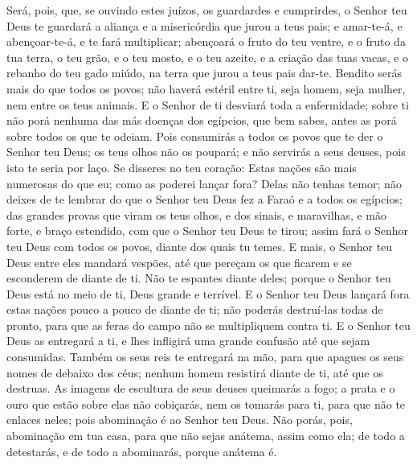 Será, pois, que, se ouvindo estes juízos, os guardardes e
cumprirdes, o Senhor teu Deus te guardará a aliança e a misericórdia
que jurou a teus pais; e amar-te-á, e abençoar-te-á, e te
fará multiplicar; abençoará o fruto do teu ventre, e o fruto da tua
terra, o teu grão, e o teu mosto, e o teu azeite, e a criação das
tuas vacas, e o rebanho do teu gado miúdo, na terra que jurou a teus
pais dar-te. Bendito serás mais do que todos os povos; não
haverá estéril entre ti, seja homem, seja mulher, nem entre os teus
animais. E o Senhor de ti desviará toda a enfermidade; sobre
ti não porá nenhuma das más doenças dos egípcios, que bem sabes,
antes as porá sobre todos os que te odeiam. Pois consumirás a
todos os povos que te der o Senhor teu Deus; os teus olhos não os
poupará; e não servirás a seus deuses, pois isto te seria por laço.
Se disseres no teu coração: Estas nações são mais numerosas
do que eu; como as poderei lançar fora? Delas não tenhas
temor; não deixes de te lembrar do que o Senhor teu Deus fez a Faraó
e a todos os egípcios; das grandes provas que viram os teus
olhos, e dos sinais, e maravilhas, e mão forte, e braço estendido,
com que o Senhor teu Deus te tirou; assim fará o Senhor teu Deus com
todos os povos, diante dos quais tu temes. E mais, o Senhor
teu Deus entre eles mandará vespões, até que pereçam os que ficarem
e se esconderem de diante de ti. Não te espantes diante
deles; porque o Senhor teu Deus está no meio de ti, Deus grande e
terrível. E o Senhor teu Deus lançará fora estas nações pouco
a pouco de diante de ti; não poderás destruí-las todas de pronto,
para que as feras do campo não se multipliquem contra ti. E o
Senhor teu Deus as entregará a ti, e lhes infligirá uma grande
confusão até que sejam consumidas. Também os seus reis te
entregará na mão, para que apagues os seus nomes de debaixo dos
céus; nenhum homem resistirá diante de ti, até que os destruas.
As imagens de escultura de seus deuses queimarás a fogo; a
prata e o ouro que estão sobre elas não cobiçarás, nem os tomarás
para ti, para que não te enlaces neles; pois abominação é ao Senhor
teu Deus. Não porás, pois, abominação em tua casa, para que
não sejas anátema, assim como ela; de todo a detestarás, e de todo a
abominarás, porque anátema é.

\medskip


